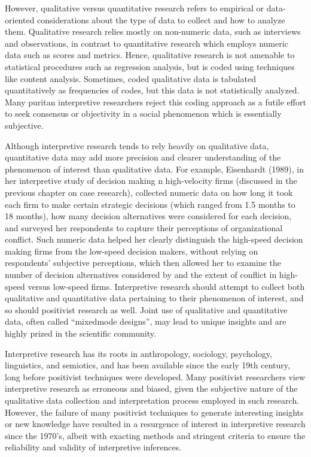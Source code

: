 However, qualitative versus quantitative research refers to empirical or data-oriented considerations about the type of data to collect and how to analyze them. Qualitative research relies mostly on non-numeric data, such as interviews and observations, in contrast to quantitative research which employs numeric data such as scores and metrics. Hence, qualitative research is not amenable to statistical procedures such as regression analysis, but is coded using techniques like content analysis. Sometimes, coded qualitative data is tabulated quantitatively as frequencies of codes, but this data is not statistically analyzed. Many puritan interpretive researchers reject this coding approach as a futile effort to seek consensus or objectivity in a social phenomenon which is essentially subjective.

Although interpretive research tends to rely heavily on qualitative data, quantitative data may add more precision and clearer understanding of the phenomenon of interest than qualitative data. For example, Eisenhardt (1989), in her interpretive study of decision making n high-velocity firms (discussed in the previous chapter on case research), collected numeric data on how long it took each firm to make certain strategic decisions (which ranged from 1.5 months to 18 months), how many decision alternatives were considered for each decision, and surveyed her respondents to capture their perceptions of organizational conflict. Such numeric data helped her clearly distinguish the high-speed decision making firms from the low-speed decision makers, without relying on respondents’ subjective perceptions, which then allowed her to examine the number of decision alternatives considered by and the extent of conflict in high-speed versus low-speed firms. Interpretive research should attempt to collect both qualitative and quantitative data pertaining to their phenomenon of interest, and so should positivist research as well. Joint use of qualitative and quantitative data, often called “mixedmode designs”, may lead to unique insights and are highly prized in the scientific community.

Interpretive research has its roots in anthropology, sociology, psychology, linguistics, and semiotics, and has been available since the early 19th century, long before positivist techniques were developed. Many positivist researchers view interpretive research as erroneous and biased, given the subjective nature of the qualitative data collection and interpretation process employed in such research. However, the failure of many positivist techniques to generate interesting insights or new knowledge have resulted in a resurgence of interest in interpretive research since the 1970’s, albeit with exacting methods and stringent criteria to ensure the reliability and validity of interpretive inferences.


